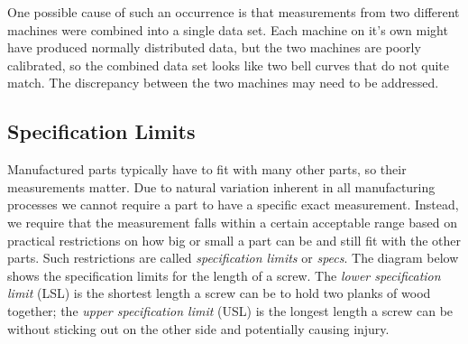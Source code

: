 \documentclass{ximera}
\begin{document}
\begin{example}
One possible cause of such an occurrence is that measurements from two different machines were combined into a single data set.  Each machine on it's own might have produced normally distributed data, but the two machines are poorly calibrated, so the combined data set looks like two bell curves that do not quite match.  The discrepancy between the two machines may need to be addressed.






\end{example}

\subsection*{Specification Limits}
Manufactured parts typically have to fit with many other parts, so their measurements matter. Due to natural variation inherent in all manufacturing processes we cannot require a part to have a specific exact measurement.  Instead, we require that the measurement falls within a certain acceptable range based on practical restrictions on how big or small a part can be and still fit with the other parts.  Such restrictions are called \emph{specification limits} or \emph{specs}.  The diagram below shows the specification limits for the length of a screw.  The \emph{lower specification limit} (LSL) is the shortest length a screw can be to hold two planks of wood together; the \emph{upper specification limit} (USL) is the longest length a screw can be without sticking out on the other side and potentially causing injury.

\begin{center}
      \end{center}
\end{document}
